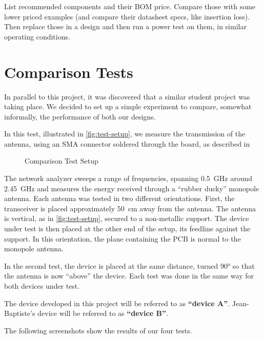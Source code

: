 List recommended components and their BOM price. Compare those with some lower
priced examples (and compare their datasheet specs, like insertion loss). Then
replace those in a design and then run a power test on them, in similar
operating conditions.




\section{Comparison Tests}

In parallel to this project, it was discovered that a similar student project
was taking place. We decided to set up a simple experiment to compare, somewhat
informally, the performance of both our designs.

In this test, illustrated in \autoref{fig:test-setup}, we measure the
transmission of the antenna, using an SMA connector soldered through the board,
as described in %

\begin{figure}[htb]
  \begin{center}
  \end{center}
  \caption{Comparison Test Setup}
  \label{fig:test-setup}
\end{figure}

The network analyzer sweeps a range of frequencies, spanning \SI{0.5}{GHz}
around \SI{2.45}{GHz} and measures the energy received through a ``rubber
ducky'' monopole antenna. Each antenna was tested in two different orientations.
First, the transceiver is placed approximately \SI{50}{cm} away from the
antenna. The antenna is vertical, as in \autoref{fig:test-setup}, secured to
a non-metallic support. The device under test is then placed at the other end of
the setup, its feedline against the support. In this orientation, the plane
containing the PCB is normal to the monopole antenna.

In the second test, the device is placed at the same distance, turned 90° so
that the antenna is now ``above'' the device. Each test was done in the same way
for both devices under test.

The device developed in this project will be referred to as \textbf{``device A''}.
Jean-Baptiste's device will be referred to as \textbf{``device B''}.


The following screenshots show the results of our four tests.

